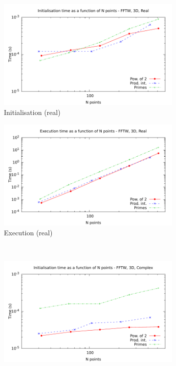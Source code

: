 \documentclass[12pt, a4paper]{article} \setlength{\textheight}{24cm}
\begin{document}
\begin{figure}[H]
  \centering
  \begin{subfigure}{.5\textwidth}
    \centering
    \includegraphics[width=.9\linewidth]{graphs/3d-fftw-init-r.pdf}
    \caption{Initialisation (real)}
    \label{3DFFTWRI}
  \end{subfigure}%
  \begin{subfigure}{.5\textwidth}
    \centering
    \includegraphics[width=.9\linewidth]{graphs/3d-fftw-exec-r.pdf}
    \caption{Execution (real)}
    \label{3DFFTWR}
  \end{subfigure}\\
  \begin{subfigure}{.5\textwidth}
    \centering
    \includegraphics[width=.9\linewidth]{graphs/3d-fftw-init-c.pdf}

\end{subfigure}
\end{figure}
\end{document}
